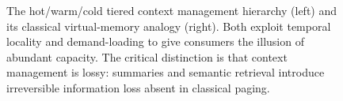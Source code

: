 \begin{figure}[htbp]
{\begin{tikzpicture}
\end{tikzpicture}}%
\caption{The hot/warm/cold tiered context management hierarchy (left) and its classical virtual-memory analogy (right). Both exploit temporal locality and demand-loading to give consumers the illusion of abundant capacity. The critical distinction is that context management is lossy: summaries and semantic retrieval introduce irreversible information loss absent in classical paging.}
\label{fig:context_tiers}
\end{figure}
